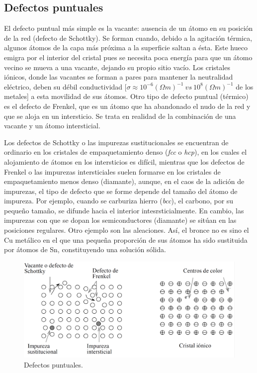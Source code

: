 \subsection{Defectos puntuales} \label{Subsec:01-06-01}

El defecto puntual más simple es la vacante: ausencia de un átomo en su posición de la red (defecto de Schottky). Se forman cuando, debido a la agitación térmica, algunos átomos de la capa más próxima a la superficie saltan a ésta. Este hueco emigra por el interior del cristal pues se necesita poca energía para que un átomo vecino se mueva a una vacante, dejando su propio sitio vacío. Los cristales iónicos, donde las vacantes se forman a pares para mantener la neutralidad eléctrico, deben su débil conductividad $[ \sigma \approx 10^{-6} (\Omega m)^{-1} \ vs \ 10^8 (\Omega m)^{-1}$ de los metales] a esta movilidad de sus  átomos. Otro tipo de defecto puntual (térmico) es el defecto de Frenkel, que es un átomo que ha abandonado el nudo de la red y que se aloja en un intersticio. Se trata en realidad de la combinación de una vacante y un átomo intersticial. %

Los defectos de Schottky o las impurezas sustitucionales se encuentran de ordinario en los cristales de empaquetamiento denso ({\it fcc} o {\it hcp}), en los cuales el alojamiento de átomos en los intersticios es difícil, mientras que los defectos de Frenkel o las impurezas intersticiales suelen formarse en los cristales de empaquetamiento menos denso (diamante), aunque, en el caos de la adición de impurezas, el tipo de defecto que se forme depende del tamaño del átomo de impureza. Por ejemplo, cuando se carburiza hierro ({\it bcc}), el carbono, por su pequeño tamaño, se difunde hacia el interior intesrsticialmente. En cambio, las impurezas con que se dopan los semiconductores (diamante) se sitúan en las posiciones regulares. Otro ejemplo son las aleaciones. Así, el bronce no es sino el Cu metálico en el que una pequeña proporción de sus átomos ha sido sustituida por átomos de Sn, constituyendo una solución sólida. 

\begin{figure}[h!] \centering
    \includegraphics[scale=0.32]{Cuerpo/Ch_01/defectos.png}
    \caption{Defectos puntuales.}
\end{figure}


